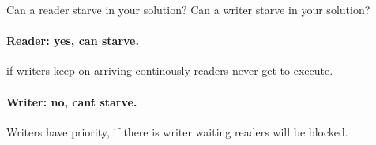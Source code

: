 \documentclass{article}
\begin{document}
\begin{enumerate}[label=\textbf{\makebox[1cm][l]{\Huge\text{(\stylishfont\alph*)}}}, leftmargin=!, labelindent=0pt]
    \item Can a reader starve in your solution? Can a writer starve
    in your solution?
    \paragraph{Reader: yes, can starve.} if writers keep on arriving
    continously readers never get to execute.
    \paragraph{Writer: no, can\'t starve.} Writers have priority, if
    there is writer waiting readers will be blocked.

\end{enumerate}


\newpage
\printbibliography
\end{document}
